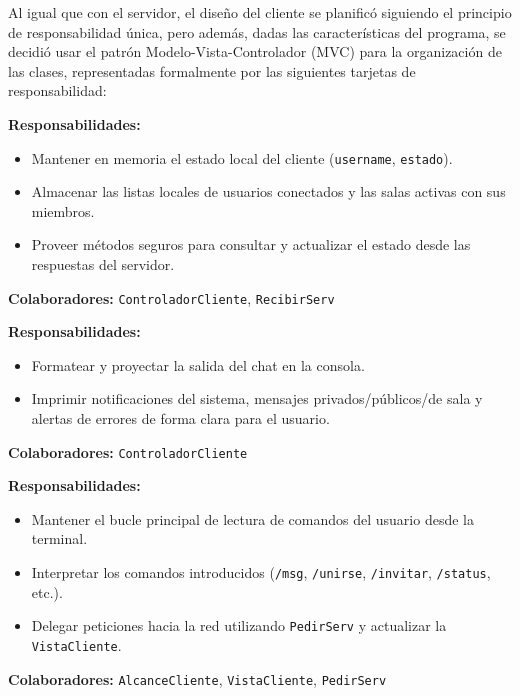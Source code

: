\documentclass[11pt,a4paper]{article}
\begin{document}
Al igual que con el servidor, el diseño del cliente se planificó siguiendo el principio de responsabilidad única, pero además, dadas las características del programa, se decidió usar el patrón Modelo-Vista-Controlador (MVC) para la organización de las clases, representadas formalmente por las siguientes tarjetas de responsabilidad:

\begin{tcolorbox}[colback=white,colframe=black,title=\textbf{Tarjeta CRC: AlcanceCliente (Modelo)}, fonttitle=\bfseries]
\textbf{Responsabilidades:}
\begin{itemize}
    \item Mantener en memoria el estado local del cliente (\texttt{username}, \texttt{estado}).
    \item Almacenar las listas locales de usuarios conectados y las salas activas con sus miembros.
    \item Proveer métodos seguros para consultar y actualizar el estado desde las respuestas del servidor.
\end{itemize}
\tcblower
\textbf{Colaboradores:} \texttt{ControladorCliente}, \texttt{RecibirServ}
\end{tcolorbox}

\begin{tcolorbox}[colback=white,colframe=black,title=\textbf{Tarjeta CRC: VistaCliente (Vista)}, fonttitle=\bfseries]
\textbf{Responsabilidades:}
\begin{itemize}
    \item Formatear y proyectar la salida del chat en la consola.
    \item Imprimir notificaciones del sistema, mensajes privados/públicos/de sala y alertas de errores de forma clara para el usuario.
\end{itemize}
\tcblower
\textbf{Colaboradores:} \texttt{ControladorCliente}
\end{tcolorbox}

\begin{tcolorbox}[colback=white,colframe=black,title=\textbf{Tarjeta CRC: ControladorCliente (Controlador)}, fonttitle=\bfseries]
\textbf{Responsabilidades:}
\begin{itemize}
    \item Mantener el bucle principal de lectura de comandos del usuario desde la terminal.
    \item Interpretar los comandos introducidos (\texttt{/msg}, \texttt{/unirse}, \texttt{/invitar}, \texttt{/status}, etc.).
    \item Delegar peticiones hacia la red utilizando \texttt{PedirServ} y actualizar la \texttt{VistaCliente}.
\end{itemize}
\tcblower
\textbf{Colaboradores:} \texttt{AlcanceCliente}, \texttt{VistaCliente}, \texttt{PedirServ}
\end{tcolorbox}
\end{document}
